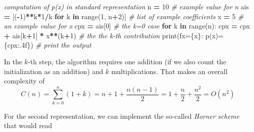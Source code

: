 \documentclass[
]{book}
\newenvironment{Shaded}{\begin{snugshade}}{\end{snugshade}}
\newcommand{\BuiltInTok}[1]{#1}
\newcommand{\CommentTok}[1]{\textcolor[rgb]{0.56,0.35,0.01}{\textit{#1}}}
\newcommand{\ControlFlowTok}[1]{\textcolor[rgb]{0.13,0.29,0.53}{\textbf{#1}}}
\newcommand{\DecValTok}[1]{\textcolor[rgb]{0.00,0.00,0.81}{#1}}
\newcommand{\KeywordTok}[1]{\textcolor[rgb]{0.13,0.29,0.53}{\textbf{#1}}}
\newcommand{\NormalTok}[1]{#1}
\newcommand{\OperatorTok}[1]{\textcolor[rgb]{0.81,0.36,0.00}{\textbf{#1}}}
\newcommand{\SpecialCharTok}[1]{\textcolor[rgb]{0.00,0.00,0.00}{#1}}
\newcommand{\SpecialStringTok}[1]{\textcolor[rgb]{0.31,0.60,0.02}{#1}}
\theoremstyle{definition}
\theoremstyle{definition}
\theoremstyle{definition}
\theoremstyle{definition}
\theoremstyle{remark}
\begin{document}
\begin{Shaded}
\begin{Highlighting}[]
\CommentTok{\textquotesingle{}\textquotesingle{}\textquotesingle{}computation of p(x) in standard representation}
\CommentTok{\textquotesingle{}\textquotesingle{}\textquotesingle{}}
\NormalTok{n }\OperatorTok{=} \DecValTok{10}                                      \CommentTok{\# example value for n}
\NormalTok{ais }\OperatorTok{=}\NormalTok{ [(}\OperatorTok{{-}}\DecValTok{1}\NormalTok{)}\OperatorTok{**}\NormalTok{k}\OperatorTok{*}\DecValTok{1}\OperatorTok{/}\NormalTok{k }\ControlFlowTok{for}\NormalTok{ k }\KeywordTok{in} \BuiltInTok{range}\NormalTok{(}\DecValTok{1}\NormalTok{, n}\OperatorTok{+}\DecValTok{2}\NormalTok{)]  }\CommentTok{\# list of example coefficients}
\NormalTok{x }\OperatorTok{=} \DecValTok{5}                                       \CommentTok{\# an example value for x}
\NormalTok{cpx }\OperatorTok{=}\NormalTok{ ais[}\DecValTok{0}\NormalTok{]                                }\CommentTok{\# the k=0 case}
\ControlFlowTok{for}\NormalTok{ k }\KeywordTok{in} \BuiltInTok{range}\NormalTok{(n):}
\NormalTok{    cpx }\OperatorTok{=}\NormalTok{ cpx }\OperatorTok{+}\NormalTok{ ais[k}\OperatorTok{+}\DecValTok{1}\NormalTok{] }\OperatorTok{*}\NormalTok{ x}\OperatorTok{**}\NormalTok{(k}\OperatorTok{+}\DecValTok{1}\NormalTok{)         }\CommentTok{\# the the k{-}th contribution}
\BuiltInTok{print}\NormalTok{(}\SpecialStringTok{f\textquotesingle{}x=}\SpecialCharTok{\{x\}}\SpecialStringTok{: p(x)=}\SpecialCharTok{\{}\NormalTok{cpx}\SpecialCharTok{:.4f\}}\SpecialStringTok{\textquotesingle{}}\NormalTok{)             }\CommentTok{\# print the output }
\end{Highlighting}
\end{Shaded}

In the \(k\)-th step, the algorithm requires one addition (if we also count the initialization as an addition) and \(k\) multiplications. That makes an overall complexity of
\begin{equation*}
C(n) = \sum_{k=0}^n(1+k) = n+1 + \frac{n(n-1)}{2} = 1 + \frac n2 + \frac{n^2}2 = O(n^2)
\end{equation*}

For the second representation, we can implement the so-called \emph{Horner scheme} that would read
\end{document}
